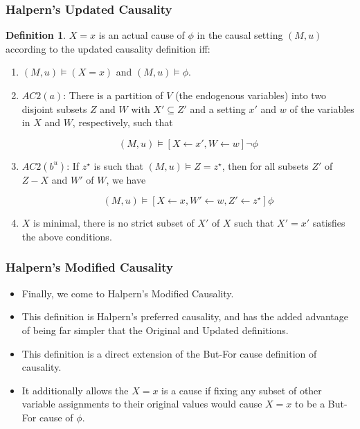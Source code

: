 \documentclass{beamer}
\theoremstyle{plain}
\theoremstyle{definition}
\newtheorem{defn}[thm]{Definition} %
\begin{document}
\begin{frame}
\frametitle{Halpern's Updated Causality}
\begin{defn}$X=x$ is an actual cause of $\phi$ in the causal setting $(M,u)$ according to the updated causality definition iff:
\begin{enumerate}
\item $(M,u) \models (X=x)$ and $(M,u) \models \phi$.
\item $AC2(a)$: There is a partition of $V$ (the endogenous variables) into two disjoint subsets $Z$ and $W$ with $X'\subseteq Z'$ and a setting $x'$ and $w$ of the variables in $X$ and $W$, respectively, such that

\[
(M,u) \models [X\leftarrow x', W\leftarrow w]\lnot \phi
\] 

\item $AC2(b^u)$: If $z^\star$ is such that $(M,u)\models Z = z^\star$, then for all subsets $Z'$ of $Z-X$ and $W'$ of $W$, we have

\[
(M,u) \models [X\leftarrow x, W' \leftarrow w, Z' \leftarrow z^\star]\phi
\] 

\item $X$ is minimal, there is no strict subset of $X'$ of $X$ such that $X' = x'$ satisfies the above conditions.
\end{enumerate}

\end{defn}
\end{frame}



\begin{frame}
\frametitle{Halpern's Modified Causality}
\begin{itemize}
\item Finally, we come to Halpern's Modified Causality.
\item This definition is Halpern's preferred causality, and has the added advantage of being far simpler that the Original and Updated definitions.
\item This definition is a direct extension of the But-For cause definition of causality.
\item It additionally allows the $X=x$ is a cause if fixing any subset of other variable assignments to their original values would cause $X=x$ to be a But-For cause of $\phi$.
\end{itemize}

\end{frame}
\end{document}

